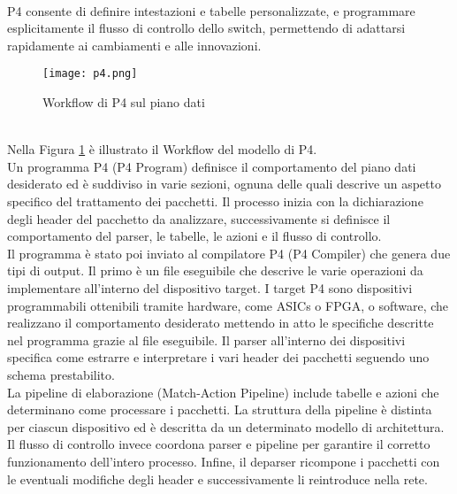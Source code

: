 \\P4 consente di definire intestazioni e tabelle personalizzate, e programmare esplicitamente il flusso di controllo dello switch, permettendo di adattarsi rapidamente ai cambiamenti e alle innovazioni.
\begin{figure}[h]
    \centering
   \texttt{[image: p4.png]}
    \caption{Workflow di P4 sul piano dati \cite{p4Article}}
    \label{fig:p4}
\end{figure}
\\Nella Figura \ref{fig:p4} è illustrato il Workflow del modello di P4.
\\Un programma P4 (P4 Program) definisce il comportamento del piano dati desiderato ed è suddiviso in varie sezioni, ognuna delle quali descrive un aspetto specifico del trattamento dei pacchetti.
Il processo inizia con la dichiarazione degli header del pacchetto da analizzare, successivamente si
definisce il comportamento del parser, le tabelle, le azioni e il flusso di controllo.
\\Il programma è stato poi inviato al compilatore P4 (P4 Compiler) che genera due tipi di output. 
Il primo è un file eseguibile che descrive le varie operazioni da implementare all'interno del dispositivo target.
I target P4 sono dispositivi programmabili ottenibili tramite hardware, come ASICs o FPGA, o software, che realizzano il comportamento desiderato mettendo in atto le specifiche descritte nel programma grazie al file eseguibile.
Il parser all'interno dei dispositivi specifica come estrarre e interpretare i vari header dei pacchetti seguendo uno schema prestabilito.
\\La pipeline di elaborazione (Match-Action Pipeline) include tabelle e azioni che determinano come processare i pacchetti. %
La struttura della pipeline è distinta per ciascun dispositivo ed è descritta da un determinato modello di architettura.
Il flusso di controllo invece coordona parser e pipeline per garantire il corretto funzionamento dell'intero processo.
Infine, il deparser ricompone i pacchetti con le eventuali modifiche degli header e successivamente li reintroduce nella rete.
